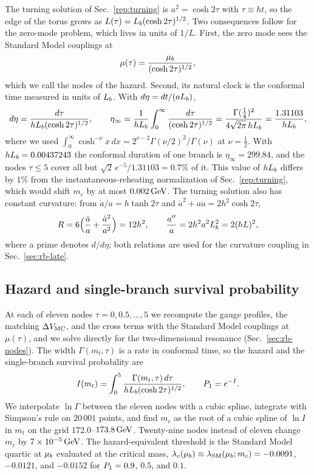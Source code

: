 The turning solution of Sec.~\ref{rep:turning} is $a^2=\cosh2\tau$ with $\tau\equiv ht$, so the edge of the torus grows as $L(\tau)=L_b(\cosh2\tau)^{1/2}$.
Two consequences follow for the zero-mode problem, which lives in units of $1/L$.
First, the zero mode sees the Standard Model couplings at
\begin{equation}
\mu(\tau)=\frac{\mu_b}{(\cosh2\tau)^{1/2}},
\label{eq:rb-mutau}
\end{equation}
which we call the nodes of the hazard.
Second, its natural clock is the conformal time measured in units of $L_b$.
With $d\eta=dt/(aL_b)$,
\begin{equation}
d\eta=\frac{d\tau}{h\Lb(\cosh2\tau)^{1/2}},\qquad
\eta_\infty=\frac{1}{h\Lb}\int_0^\infty\frac{d\tau}{(\cosh2\tau)^{1/2}}=\frac{\Gamma(\frac14)^2}{4\sqrt{2\pi}\,h\Lb}=\frac{1.31103}{h\Lb}, %
\label{eq:rb-etainf}
\end{equation}
where we used $\int_0^\infty\cosh^{-\nu}x\,dx=2^{\nu-2}\Gamma(\nu/2)^2/\Gamma(\nu)$ at $\nu=\frac12$.
With $hL_b=0.00437243$ the conformal duration of one branch is $\eta_\infty=299.84$, and the nodes $\tau\le5$ cover all but $\sqrt2\,e^{-5}/1.31103=0.7\%$ of it. %
This value of $hL_b$ differs by $1\%$ from the instantaneous-reheating normalization of Sec.~\ref{rep:turning}, which would shift $m_c$ by at most $0.002\,\mathrm{GeV}$. %
The turning solution also has constant curvature: from $\dot a/a=h\tanh2\tau$ and $\dot a^2+a\ddot a=2h^2\cosh2\tau$,
\begin{equation}
R=6\Bigl(\frac{\ddot a}{a}+\frac{\dot a^2}{a^2}\Bigr)=12h^2,\qquad \frac{a''}{a}=2h^2a^2L_b^2=2(hL)^2,
\label{eq:rb-R}
\end{equation}
where a prime denotes $d/d\eta$; both relations are used for the curvature coupling in Sec.~\ref{sec:rb-late}.

\subsection{Hazard and single-branch survival probability}
\label{sec:rb-hazard}

At each of eleven nodes $\tau=0,0.5,\ldots,5$ we recompute the gauge profiles, the matching $\Delta V_{\rm MC}$, and the cross terms with the Standard Model couplings at $\mu(\tau)$, and we solve directly for the two-dimensional resonance (Sec.~\ref{sec:rb-nodes}).
The width $\Gamma(m_t,\tau)$ is a rate in conformal time, so the hazard and the single-branch survival probability are
\begin{equation}
I(m_t)=\int_0^5\frac{\Gamma(m_t,\tau)\,d\tau}{hL_b(\cosh2\tau)^{1/2}},\qquad P_1=e^{-I}.
\label{eq:rb-hazard}
\end{equation}
We interpolate $\ln\Gamma$ between the eleven nodes with a cubic spline, integrate with Simpson's rule on $20\,001$ points, and find $m_c$ as the root of a cubic spline of $\ln I$ in $m_t$ on the grid $172.0$--$173.8\,\mathrm{GeV}$. %
Twenty-nine nodes instead of eleven change $m_c$ by $7\times10^{-5}\,\mathrm{GeV}$. %
The hazard-equivalent threshold is the Standard Model quartic at $\mu_b$ evaluated at the critical mass, $\lambda_c(\mu_b)\equiv\lambda_{\rm SM}(\mu_b;m_c)=-0.0091$, $-0.0121$, and $-0.0152$ for $P_1=0.9$, $0.5$, and $0.1$. %

